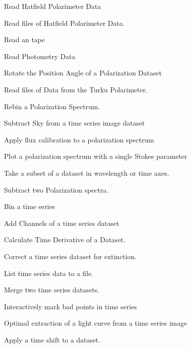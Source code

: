 \begin{mansectionroutines}
        Read Hatfield Polarimeter Data

        Read {} files of Hatfield Polarimeter Data.

        Read an {} tape

        Read {} Photometry Data

        Rotate the Position Angle of a Polarization Dataset

        Read {} files of Data from the Turku {} %
Polarimeter.

        Rebin a Polarization Spectrum.

        Subtract Sky from a time series image dataset

        Apply flux calibration to a polarization spectrum

        Plot a polarization spectrum with a single Stokes parameter

        Take a subset of a dataset in wavelength or time axes.

        Subtract two Polarization spectra.

        Bin a time series

        Add Channels of a time series dataset

        Calculate Time Derivative of a Dataset.

        Correct a time series dataset for extinction.

        List time series data to a file.

        Merge two time series datasets.

        Interactively mark bad points in time series

        Optimal extraction of a light curve from a time series image

        Apply a time shift to a dataset.


\end{mansectionroutines}
